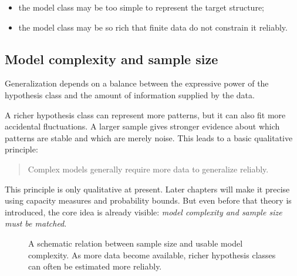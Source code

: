 \begin{itemize}
    \item the model class may be too simple to represent the target structure;
    \item the model class may be so rich that finite data do not constrain it reliably.
\end{itemize}

\subsection*{Model complexity and sample size}

Generalization depends on a balance between the expressive power of the hypothesis class and the amount of information supplied by the data.

A richer hypothesis class can represent more patterns, but it can also fit more accidental fluctuations. A larger sample gives stronger evidence about which patterns are stable and which are merely noise. This leads to a basic qualitative principle:

\begin{quote}
Complex models generally require more data to generalize reliably.
\end{quote}

This principle is only qualitative at present. Later chapters will make it precise using capacity measures and probability bounds. But even before that theory is introduced, the core idea is already visible: \emph{model complexity and sample size must be matched}.

\begin{figure}[tbp]
\centering
{}
\caption{A schematic relation between sample size and usable model complexity. As more data become available, richer hypothesis classes can often be estimated more reliably.}
\end{figure}

